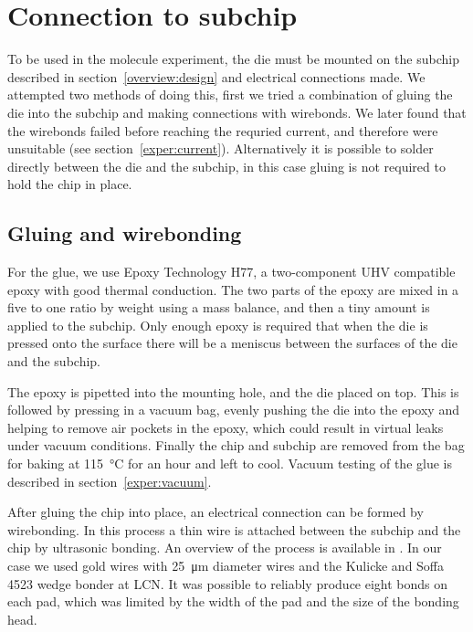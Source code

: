 \section{Connection to subchip}

To be used in the molecule experiment, the die must be mounted on the subchip
described in section~\ref{overview:design} and electrical connections made. We
attempted two methods of doing this, first we tried a combination of gluing the
die into the subchip and making connections with wirebonds. We later found that
the wirebonds failed before reaching the requried current, and therefore were
unsuitable (see section~\ref{exper:current}). Alternatively it is possible to
solder directly between the die and the subchip, in this case gluing is not
required to hold the chip in place.

\subsection{Gluing and wirebonding}
\label{fab:gluebond}

For the glue, we use Epoxy Technology H77, a two-component UHV compatible epoxy
with good thermal conduction.  The two parts of the epoxy are mixed in a five
to one ratio by weight using a mass balance, and then a tiny amount is applied
to the subchip. Only enough epoxy is required that when the die is pressed onto
the surface there will be a meniscus between the surfaces of the die and the
subchip.

The epoxy is pipetted into the mounting hole, and the die placed on top. This
is followed by pressing in a vacuum bag, evenly pushing the die into the epoxy
and helping to remove air pockets in the epoxy, which could result in
virtual leaks under vacuum conditions.
%
Finally the chip and subchip are removed from the bag for baking at
\SI{115}{\celsius} for an hour and left to cool. Vacuum testing of the glue is
described in section~\ref{exper:vacuum}.

After gluing the chip into place, an electrical connection can be formed by
wirebonding. In this process a thin wire is attached between the subchip and
the chip by ultrasonic bonding. An overview of the process is available in
. In our case we used gold wires with
\SI{25}{\micro\meter} diameter wires and the Kulicke and Soffa 4523 wedge
bonder at LCN. It was possible to reliably produce eight bonds on each pad,
which was limited by the width of the pad and the size of the bonding head.

